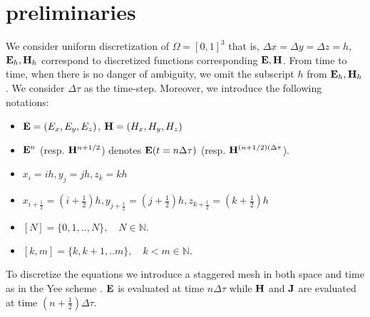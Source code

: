 \documentclass[12pt,reqno]{amsart}
\newcommand{\N}{\mathbb{N}}
\newcommand{\e}{{\bf E}}
\newcommand{\h}{{\bf H}}
\theoremstyle{definition}
\numberwithin{equation}{section}
\def\Gw{\Omega}     \def\Gx{\Xi}         \def\Gy{\Psi}
\begin{document}
	\section{preliminaries}
	We consider uniform discretization of $\Gw=[0,1]^3$ that is,
	 $\Delta x=\Delta y=\Delta z=h$,
	 $\e_h, \h_h$ correspond to discretized functions corresponding $\e,\h$.
	 From time to time, when there is no danger of ambiguity, we omit the subscript $h$ from $\e_h,\h_h$.
	 We consider $\Delta \tau $ as the time-step.
	Moreover, we   introduce the following notations:
	\begin{itemize}
		\item $\e=(E_x,E_y,E_z)$, $\h=(H_x,H_y,H_z)$\\[1mm]
		\item $\e^n$  (resp. $\h^{n+1/2}$) denotes $\e(t=n\Delta \tau)$ (resp. $\h^{(n+1/2)(\Delta \tau}$).\\[1mm]
		\item $x_{i}=i h,y_{j}=j h,z_{k}=k h$ \\[1mm]
		\item $x_{i+\frac{1}{2}}=\left (i+\frac{1}{2}\right ) h, y_{j+\frac{1}{2}}=\left (j+\frac{1}{2}\right ) h, z_{k+\frac{1}{2}}=\left (k+\frac{1}{2}\right ) h$ \\[1mm]
		\item 	$[N]=\{0,1,..,N\},\quad N\in \N.$\\[1mm]
				\item 	$[k,m]=\{k,k+1,..m\},\quad k<m\in \N.$\\[1mm]
	\end{itemize}

	To discretize the equations we introduce a staggered mesh in both space and time as in the Yee scheme \cite{yee}. 
	$\e$ is  evaluated at time $n\Delta \tau$ while $\bf{H}$ and $\bf{J}$ are evaluated at time $(n\!+\! \frac{1}{2})\Delta \tau$.
\end{document}
